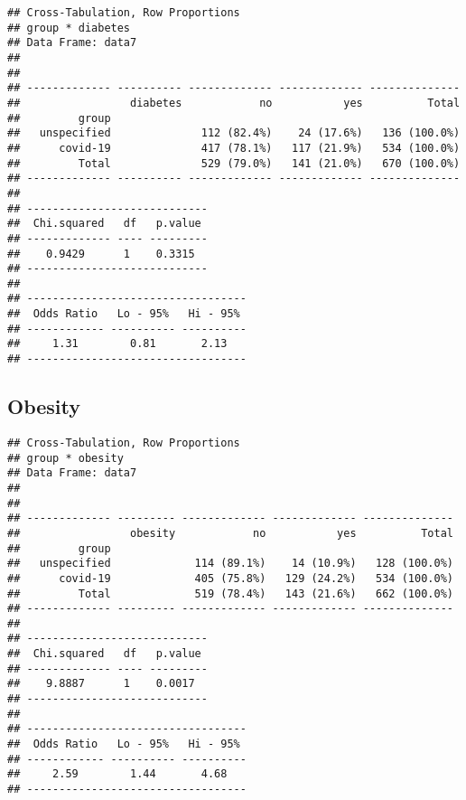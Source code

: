 \documentclass[
]{article}
\newenvironment{Shaded}{\begin{snugshade}}{\end{snugshade}}
\newcommand{\AttributeTok}[1]{\textcolor[rgb]{0.77,0.63,0.00}{#1}}
\newcommand{\ConstantTok}[1]{\textcolor[rgb]{0.00,0.00,0.00}{#1}}
\newcommand{\FunctionTok}[1]{\textcolor[rgb]{0.00,0.00,0.00}{#1}}
\newcommand{\NormalTok}[1]{#1}
\newcommand{\SpecialCharTok}[1]{\textcolor[rgb]{0.00,0.00,0.00}{#1}}
\newcommand{\StringTok}[1]{\textcolor[rgb]{0.31,0.60,0.02}{#1}}
\begin{document}
\begin{verbatim}
## Cross-Tabulation, Row Proportions  
## group * diabetes  
## Data Frame: data7  
## 
## 
## ------------- ---------- ------------- ------------- --------------
##                 diabetes            no           yes          Total
##         group                                                      
##   unspecified              112 (82.4%)    24 (17.6%)   136 (100.0%)
##      covid-19              417 (78.1%)   117 (21.9%)   534 (100.0%)
##         Total              529 (79.0%)   141 (21.0%)   670 (100.0%)
## ------------- ---------- ------------- ------------- --------------
## 
## ----------------------------
##  Chi.squared   df   p.value 
## ------------- ---- ---------
##    0.9429      1    0.3315  
## ----------------------------
## 
## ----------------------------------
##  Odds Ratio   Lo - 95%   Hi - 95% 
## ------------ ---------- ----------
##     1.31        0.81       2.13   
## ----------------------------------
\end{verbatim}

\hypertarget{obesity}{%
\subsection{Obesity}\label{obesity}}

\begin{Shaded}
\end{Shaded}

\begin{verbatim}
## Cross-Tabulation, Row Proportions  
## group * obesity  
## Data Frame: data7  
## 
## 
## ------------- --------- ------------- ------------- --------------
##                 obesity            no           yes          Total
##         group                                                     
##   unspecified             114 (89.1%)    14 (10.9%)   128 (100.0%)
##      covid-19             405 (75.8%)   129 (24.2%)   534 (100.0%)
##         Total             519 (78.4%)   143 (21.6%)   662 (100.0%)
## ------------- --------- ------------- ------------- --------------
## 
## ----------------------------
##  Chi.squared   df   p.value 
## ------------- ---- ---------
##    9.8887      1    0.0017  
## ----------------------------
## 
## ----------------------------------
##  Odds Ratio   Lo - 95%   Hi - 95% 
## ------------ ---------- ----------
##     2.59        1.44       4.68   
## ----------------------------------
\end{verbatim}
\end{document}
